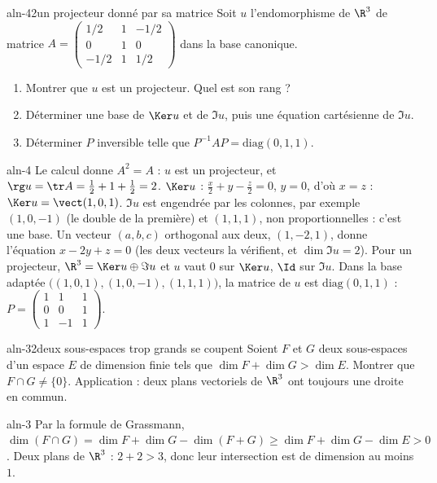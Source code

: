 \begin{exo}{aln-4}{2}{un projecteur donné par sa matrice}
Soit $u$ l'endomorphisme de $\R^3$ de matrice $A=\begin{pmatrix}1/2&1&-1/2\\0&1&0\\-1/2&1&1/2\end{pmatrix}$ dans la base canonique.
\begin{enumerate}
\item Montrer que $u$ est un projecteur. Quel est son rang ?
\item Déterminer une base de $\Ker u$ et de $\Im u$, puis une équation cartésienne de $\Im u$.
\item Déterminer $P$ inversible telle que $P^{-1}AP=\mathrm{diag}(0,1,1)$.
\end{enumerate}
\end{exo}
\begin{corrige}{aln-4}
 Le calcul donne $A^2=A$ : $u$ est un projecteur, et $\rg u=\tr A=\frac12+1+\frac12=2$.
 $\Ker u$ : $\frac x2+y-\frac z2=0$, $y=0$, d'où $x=z$ : $\Ker u=\vect(1,0,1)$. $\Im u$ est engendrée par les colonnes, par
exemple $(1,0,-1)$ (le double de la première) et $(1,1,1)$, non proportionnelles : c'est une base. Un vecteur $(a,b,c)$ orthogonal
aux deux, $(1,-2,1)$, donne l'équation $x-2y+z=0$ (les deux vecteurs la vérifient, et $\dim\Im u=2$).
 Pour un projecteur, $\R^3=\Ker u\oplus\Im u$ et $u$ vaut $0$ sur $\Ker u$, $\Id$ sur $\Im u$. Dans la base adaptée
$\big((1,0,1),(1,0,-1),(1,1,1)\big)$, la matrice de $u$ est $\mathrm{diag}(0,1,1)$ : $P=\begin{pmatrix}1&1&1\\0&0&1\\1&-1&1\end{pmatrix}$.
\end{corrige}

\begin{exo}{aln-3}{2}{deux sous-espaces trop grands se coupent}
Soient $F$ et $G$ deux sous-espaces d'un espace $E$ de dimension finie tels que $\dim F+\dim G>\dim E$. Montrer que
$F\cap G\neq\{0\}$. Application : deux plans vectoriels de $\R^3$ ont toujours une droite en commun.
\end{exo}
\begin{corrige}{aln-3}
Par la formule de Grassmann, $\dim(F\cap G)=\dim F+\dim G-\dim(F+G)\geq\dim F+\dim G-\dim E>0$. Deux plans de $\R^3$ :
$2+2>3$, donc leur intersection est de dimension au moins $1$.
\end{corrige}

